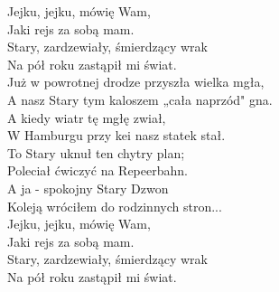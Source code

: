 Jejku, jejku, mówię Wam, \\
Jaki rejs za sobą mam. \\
Stary, zardzewiały, śmierdzący wrak \\
Na pół roku zastąpił mi świat. \\

Już w powrotnej drodze przyszła wielka mgła, \\
A nasz Stary tym kaloszem „cała naprzód" gna. \\
A kiedy wiatr tę mgłę zwiał, \\
W Hamburgu przy kei nasz statek stał. \\
To Stary uknuł ten chytry plan; \\
Poleciał ćwiczyć na Repeerbahn. \\
A ja - spokojny Stary Dzwon \\
Koleją wróciłem do rodzinnych stron... \\

Jejku, jejku, mówię Wam, \\
Jaki rejs za sobą mam. \\
Stary, zardzewiały, śmierdzący wrak \\
Na pół roku zastąpił mi świat. \\
